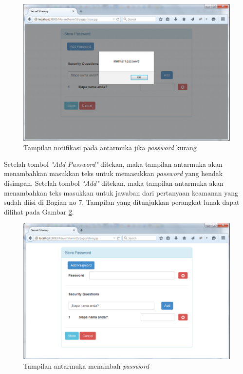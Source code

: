 \begin{figure}[H]
	\includegraphics[scale=0.5]{Gambar/tampilan2_2}
	\centering
	\caption{Tampilan notifikasi pada antarmuka jika \textit{password} kurang}\label{fig:tampilan2_2}
\end{figure}

Setelah tombol \textit{"Add Password"} ditekan, maka tampilan antarmuka akan menambahkan masukkan teks untuk memasukkan \textit{password} yang hendak disimpan. Setelah tombol \textit{"Add"} ditekan, maka tampilan antarmuka akan menambahkan teks masukkan untuk jawaban dari pertanyaan keamanan yang sudah diisi di Bagian no 7. Tampilan yang ditunjukkan perangkat lunak dapat dilihat pada Gambar \ref{fig:tampilan2_1}.

\begin{figure}[H]
	\includegraphics[scale=0.5]{Gambar/tampilan2_1}
	\centering
	\caption{Tampilan antarmuka menambah \textit{password}}\label{fig:tampilan2_1}
\end{figure}

